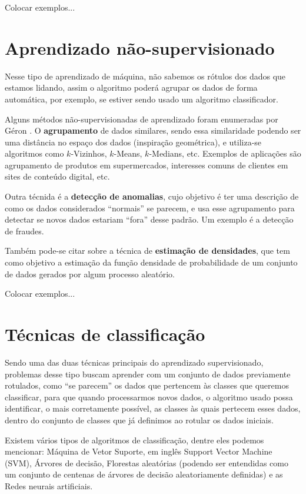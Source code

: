 Colocar exemplos...

\section{Aprendizado não-supervisionado}

Nesse tipo de aprendizado de máquina, não sabemos os rótulos dos dados que estamos lidando, assim o algoritmo poderá agrupar os dados de forma automática, por exemplo, se estiver sendo usado um algoritmo classificador.

Alguns métodos não-supervisionadas de aprendizado foram enumeradas por Géron \citep{hands}. O \textbf{agrupamento} de dados similares, sendo essa similaridade podendo ser uma distância no espaço dos dados (inspiração geométrica), e utiliza-se algoritmos como $k$-Vizinhos, $k$-Means, $k$-Medians, etc. Exemplos de aplicações são agrupamento de produtos em supermercados, interesses comuns de clientes em sites de conteúdo digital, etc.

Outra técnida é a \textbf{detecção de anomalias}, cujo objetivo é ter uma descrição de como os dados considerados ``normais'' se parecem, e usa esse agrupamento para detectar se novos dados estariam ``fora'' desse padrão. Um exemplo é a detecção de fraudes.

Também pode-se citar sobre a técnica de \textbf{estimação de densidades}, que tem como objetivo a estimação da função densidade de probabilidade de um conjunto de dados gerados por algum processo aleatório.

Colocar exemplos...

\section{Técnicas de classificação}

Sendo uma das duas técnicas principais do aprendizado supervisionado, problemas desse tipo buscam aprender com um conjunto de dados previamente rotulados, como ``se parecem'' os dados que pertencem às classes que queremos classificar, para que quando processarmos novos dados, o algoritmo usado possa identificar, o mais corretamente possível, as classes às quais pertecem esses dados, dentro do conjunto de classes que já definimos ao rotular os dados iniciais.

Existem vários tipos de algoritmos de classificação, dentre eles podemos mencionar: Máquina de Vetor Suporte, em inglês Support Vector Machine (SVM), Árvores de decisão, Florestas aleatórias (podendo ser entendidas como um conjunto de centenas de árvores de decisão aleatoriamente definidas) e as Redes neurais artificiais.

